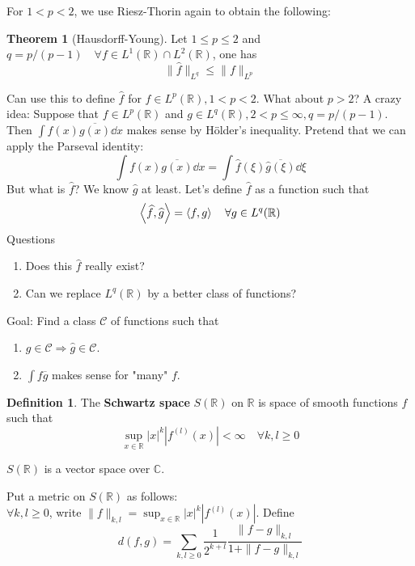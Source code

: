 \documentclass{article}
\theoremstyle{definition}
\newtheorem{thm}{Theorem}
\newtheorem{dfn}{Definition}
\newcommand{\C}{\mathcal C}
\newcommand{\CC}{\mathbb C}
\newcommand{\RR}{\mathbb R}
\newcommand{\Ra}{\Rightarrow}
\begin{document}
For $1 < p < 2$, we use Riesz-Thorin again to obtain the following:
\begin{thm}[Hausdorff-Young]
	Let $1 \leq p \leq 2$ and $q = p/(p - 1) \quad \forall f \in L^1(\RR) \cap L^2(\RR)$, one has
	\[
		\| \widehat{f} \|_{L^q} \leq \|f\|_{L^p}
	\]
\end{thm}
Can use this to define $\widehat{f}$ for $f \in L^p(\RR), 1 < p < 2$.
What about $p > 2$?
A crazy idea:
Suppose that $f \in L^p(\RR)$ and $g \in L^q(\RR), 2 < p \leq \infty, q = p/(p - 1)$.
Then $\int f(x) \overline{g(x)} \dd{x}$ makes sense by H\"older's inequality.
Pretend that we can apply the Parseval identity:
\[
	\int f(x) \overline{g(x)} \dd{x} = \int \widehat{f}(\xi) \overline{\widehat{g}(\xi)} \dd{\xi}
\]
But what is $\widehat{f}$? 
We know $\widehat{g}$ at least.
Let's define $\widehat{f}$ as a function such that
\[
	\ev{\widehat{f}, \widehat{g}} = \ev{f, g} \quad \forall g \in L^q(\RR)
\]
Questions
\begin{enumerate}
	\item Does this $\widehat{f}$ really exist?

	\item Can we replace $L^q(\RR)$ by a better class of functions?
\end{enumerate}

Goal: Find a class $\C$ of functions such that

\begin{enumerate}
	\item $g \in \C \Ra \widehat{g} \in \C$.

	\item $\int f \overline{g}$ makes sense for "many" $f$.
\end{enumerate}

\begin{dfn}
	The \textbf{Schwartz space} $S(\RR)$ on $\RR$ is space of smooth functions $f$ such that
	\[
		\sup_{x \in \RR} |x|^k |f^{(l)}(x)| < \infty \quad \forall k, l \geq 0
	\]
\end{dfn}

$S(\RR)$ is a vector space over $\CC$.

\par Put a metric on $S(\RR)$ as follows:\\
$\forall k, l \geq 0$, write $\|f\|_{k, l} = \sup_{x \in \RR} |x|^k |f^{(l)}(x)|$.
Define 
\[
	d(f, g) = \sum_{k, l \geq 0} \frac{1}{2^{k + l}} \frac{\|f - g\|_{k, l}}{1 + \|f - g\|_{k, l}}
\]
\end{document}
